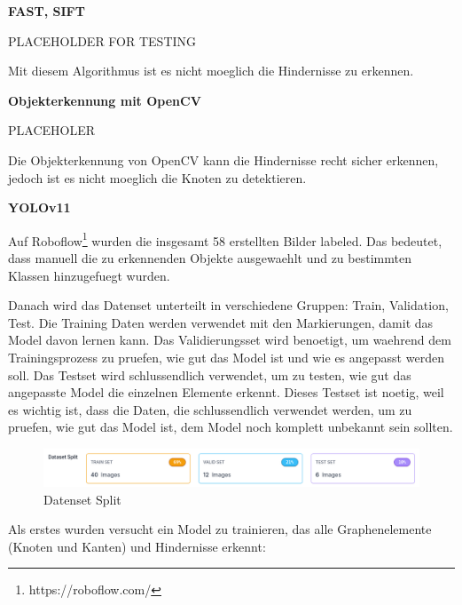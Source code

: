 \textbf{FAST, SIFT}

PLACEHOLDER FOR TESTING

Mit diesem Algorithmus ist es nicht moeglich die Hindernisse zu erkennen.

\textbf{Objekterkennung mit OpenCV}

PLACEHOLER

Die Objekterkennung von OpenCV kann die Hindernisse recht sicher erkennen, jedoch ist es nicht moeglich die Knoten zu detektieren.

\textbf{YOLOv11}

Auf Roboflow\footnote{https://roboflow.com/} wurden die insgesamt 58 erstellten Bilder labeled.
Das bedeutet, dass manuell die zu erkennenden Objekte ausgewaehlt und zu bestimmten Klassen hinzugefuegt wurden.

Danach wird das Datenset unterteilt in verschiedene Gruppen: Train, Validation, Test. Die Training Daten werden verwendet mit den Markierungen, damit das Model davon lernen kann. Das Validierungsset wird benoetigt, um waehrend dem Trainingsprozess zu pruefen, wie gut das Model ist und wie es angepasst werden soll. Das Testset wird schlussendlich verwendet, um zu testen, wie gut das angepasste Model die einzelnen Elemente erkennt. Dieses Testset ist noetig, weil es wichtig ist, dass die Daten, die schlussendlich verwendet werden, um zu pruefen, wie gut das Model ist, dem Model noch komplett unbekannt sein sollten.
\begin{figure}[H]
    \centering
    \includegraphics[width=\linewidth]{assets/informatik-prototyp/yolo/dataset-split.png}
    \caption{Datenset Split}
    \label{fig:data-split}
\end{figure}

Als erstes wurden versucht ein Model zu trainieren, das alle Graphenelemente (Knoten und Kanten) und Hindernisse erkennt:

